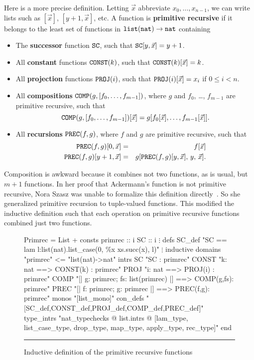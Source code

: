 \documentclass[12pt]{article}
\newcommand\defn[1]{{\bf#1}}
\newcommand\nat{\hbox{\tt nat}}
\newcommand\lst{\hbox{\tt list}}
\newcommand\SC{\hbox{\tt SC}}
\newcommand\CONST{\hbox{\tt CONST}}
\newcommand\PROJ{\hbox{\tt PROJ}}
\newcommand\COMP{\hbox{\tt COMP}}
\newcommand\PREC{\hbox{\tt PREC}}
\begin{document}
Here is a more precise definition.  Letting $\vec{x}$ abbreviate
$x_0,\ldots,x_{n-1}$, we can write lists such as $[\vec{x}]$,
$[y+1,\vec{x}]$, etc.  A function is \defn{primitive recursive} if it
belongs to the least set of functions in $\lst(\nat)\to\nat$ containing
\begin{itemize}
\item The \defn{successor} function $\SC$, such that $\SC[y,\vec{x}]=y+1$.
\item All \defn{constant} functions $\CONST(k)$, such that
  $\CONST(k)[\vec{x}]=k$. 
\item All \defn{projection} functions $\PROJ(i)$, such that
  $\PROJ(i)[\vec{x}]=x_i$ if $0\leq i<n$. 
\item All \defn{compositions} $\COMP(g,[f_0,\ldots,f_{m-1}])$, 
where $g$ and $f_0$, \ldots, $f_{m-1}$ are primitive recursive,
such that
\[ \COMP(g,[f_0,\ldots,f_{m-1}])[\vec{x}] = 
   g[f_0[\vec{x}],\ldots,f_{m-1}[\vec{x}]]. \] 

\item All \defn{recursions} $\PREC(f,g)$, where $f$ and $g$ are primitive
  recursive, such that
\begin{eqnarray*}
  \PREC(f,g)[0,\vec{x}] & = & f[\vec{x}] \\
  \PREC(f,g)[y+1,\vec{x}] & = & g[\PREC(f,g)[y,\vec{x}],\, y,\, \vec{x}].
\end{eqnarray*} 
\end{itemize}
Composition is awkward because it combines not two functions, as is usual,
but $m+1$ functions.  In her proof that Ackermann's function is not
primitive recursive, Nora Szasz was unable to formalize this definition
directly~\cite{szasz93}.  So she generalized primitive recursion to
tuple-valued functions.  This modified the inductive definition such that
each operation on primitive recursive functions combined just two functions.

\begin{figure}
\begin{ttbox}
Primrec = List +
consts
  primrec :: i
  SC      :: i
  \(\vdots\)
defs
  SC_def    "SC == lam l:list(nat).list_case(0, \%x xs.succ(x), l)"
  \(\vdots\)
inductive
  domains "primrec" <= "list(nat)->nat"
  intrs
    SC       "SC : primrec"
    CONST    "k: nat ==> CONST(k) : primrec"
    PROJ     "i: nat ==> PROJ(i) : primrec"
    COMP     "[| g: primrec; fs: list(primrec) |] ==> COMP(g,fs): primrec"
    PREC     "[| f: primrec; g: primrec |] ==> PREC(f,g): primrec"
  monos      "[list_mono]"
  con_defs   "[SC_def,CONST_def,PROJ_def,COMP_def,PREC_def]"
  type_intrs "nat_typechecks @ list.intrs @                      
              [lam_type, list_case_type, drop_type, map_type,    
               apply_type, rec_type]"
end
\end{ttbox}
\hrule
\caption{Inductive definition of the primitive recursive functions} 
\label{primrec-fig}
\end{figure}
\def\fs{{\it fs}} 
\end{document}
